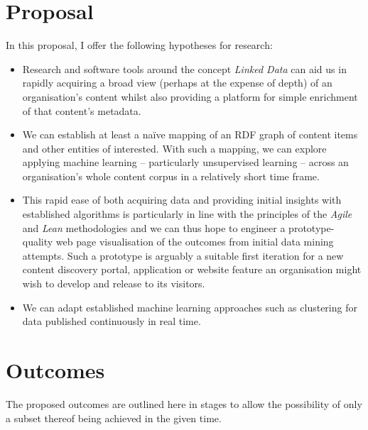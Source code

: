 \documentclass[10pt,a4paper]{article}
\begin{document}
\section{Proposal}

In this proposal, I offer the following hypotheses for research:

\begin{itemize}

\item Research and software tools around the concept \emph{Linked Data} can aid
us in rapidly acquiring a broad view (perhaps at the expense of depth) of an
organisation's content whilst also providing a platform for simple enrichment of
that content's metadata.

\item We can establish at least a naïve mapping of an RDF graph of content items
and other entities of interested. With such a mapping, we can explore applying
machine learning -- particularly unsupervised learning -- across an
organisation's whole content corpus in a relatively short time frame.

\item This rapid ease of both acquiring data and providing initial insights with
established algorithms is particularly in line with the principles of the
\emph{Agile} and \emph{Lean} methodologies and we can thus hope to engineer a
prototype-quality web page visualisation of the outcomes from initial data
mining attempts. Such a prototype is arguably a suitable first iteration for a
new content discovery portal, application or website feature an organisation
might wish to develop and release to its visitors.

\item We can adapt established machine learning approaches such as clustering
for data published continuously in real time.

\end{itemize}

\section{Outcomes}

The proposed outcomes are outlined here in stages to allow the possibility of
only a subset thereof being achieved in the given time.
\end{document}
